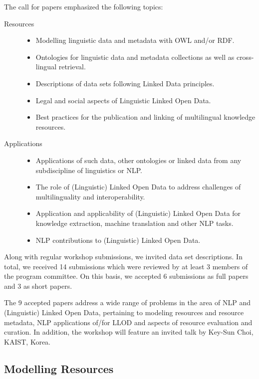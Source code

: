 The call for papers emphasized the following topics:

\begin{description}
\item[Resources]
	\begin{itemize}
	\item Modelling linguistic data and metadata with OWL and/or RDF.
    \item Ontologies for linguistic data and metadata collections as well as cross-lingual retrieval.
    \item Descriptions of data sets following Linked Data principles.
    \item Legal and social aspects of Linguistic Linked Open Data.
    \item Best practices for the publication and linking of multilingual knowledge resources.
	\end{itemize}
\item[Applications]
	\begin{itemize}
	\item Applications of such data, other ontologies or linked data from any subdiscipline of linguistics or NLP.
    \item The role of (Linguistic) Linked Open Data to address challenges of multilinguality and interoperability.
    \item Application and applicability of (Linguistic) Linked Open Data for knowledge extraction, machine translation and other NLP tasks.
    \item NLP contributions to (Linguistic) Linked Open Data.
	\end{itemize}
\end{description}

\noindent 
Along with regular workshop submissions, we invited data set descriptions.
In total, we received 14 submissions which were reviewed by at least 3 members of the program committee. 
On this basis, we accepted 6 submissions as full papers and 3 as short papers.

The 9 accepted papers address a wide range of problems in the area of NLP and (Linguistic) Linked Open Data, pertaining to modeling resources and resource metadata, NLP applications of/for LLOD and aspects of resource evaluation and curation. In addition, the workshop will feature an invited talk by Key-Sun Choi, KAIST, Korea.

\subsection{Modelling Resources}

